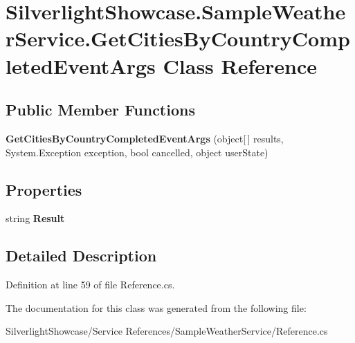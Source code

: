 \hypertarget{class_silverlight_showcase_1_1_sample_weather_service_1_1_get_cities_by_country_completed_event_args}{
\section{SilverlightShowcase.SampleWeatherService.GetCitiesByCountryCompletedEventArgs Class Reference}
\label{class_silverlight_showcase_1_1_sample_weather_service_1_1_get_cities_by_country_completed_event_args}
}
\subsection*{Public Member Functions}
\begin{DoxyCompactItemize}
\item 
\hypertarget{class_silverlight_showcase_1_1_sample_weather_service_1_1_get_cities_by_country_completed_event_args_a19553a85fdd83d54aa0b7db3991b9835}{
{\bfseries GetCitiesByCountryCompletedEventArgs} (object\mbox{[}$\,$\mbox{]} results, System.Exception exception, bool cancelled, object userState)}
\label{class_silverlight_showcase_1_1_sample_weather_service_1_1_get_cities_by_country_completed_event_args_a19553a85fdd83d54aa0b7db3991b9835}

\end{DoxyCompactItemize}
\subsection*{Properties}
\begin{DoxyCompactItemize}
\item 
\hypertarget{class_silverlight_showcase_1_1_sample_weather_service_1_1_get_cities_by_country_completed_event_args_a4a77e50293daa1016b9d7b0f9fd8d76d}{
string {\bfseries Result}}
\label{class_silverlight_showcase_1_1_sample_weather_service_1_1_get_cities_by_country_completed_event_args_a4a77e50293daa1016b9d7b0f9fd8d76d}

\end{DoxyCompactItemize}


\subsection{Detailed Description}


Definition at line 59 of file Reference.cs.

The documentation for this class was generated from the following file:\begin{DoxyCompactItemize}
\item 
SilverlightShowcase/Service References/SampleWeatherService/Reference.cs\end{DoxyCompactItemize}

